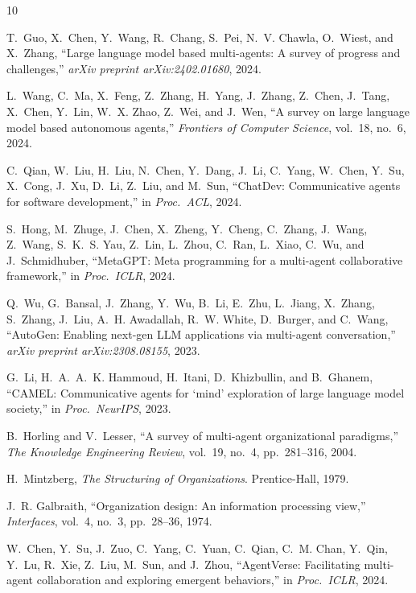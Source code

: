 \documentclass[conference]{IEEEtran}
\begin{document}
\begin{thebibliography}{10}

T.~Guo, X.~Chen, Y.~Wang, R.~Chang, S.~Pei, N.~V. Chawla, O.~Wiest, and X.~Zhang,
``Large language model based multi-agents: A survey of progress and challenges,''
\emph{arXiv preprint arXiv:2402.01680}, 2024.

L.~Wang, C.~Ma, X.~Feng, Z.~Zhang, H.~Yang, J.~Zhang, Z.~Chen, J.~Tang, X.~Chen, Y.~Lin, W.~X. Zhao, Z.~Wei, and J.~Wen,
``A survey on large language model based autonomous agents,''
\emph{Frontiers of Computer Science}, vol.~18, no.~6, 2024.

C.~Qian, W.~Liu, H.~Liu, N.~Chen, Y.~Dang, J.~Li, C.~Yang, W.~Chen, Y.~Su, X.~Cong, J.~Xu, D.~Li, Z.~Liu, and M.~Sun,
``ChatDev: Communicative agents for software development,''
in \emph{Proc.\ ACL}, 2024.

S.~Hong, M.~Zhuge, J.~Chen, X.~Zheng, Y.~Cheng, C.~Zhang, J.~Wang, Z.~Wang, S.~K.~S. Yau, Z.~Lin, L.~Zhou, C.~Ran, L.~Xiao, C.~Wu, and J.~Schmidhuber,
``MetaGPT: Meta programming for a multi-agent collaborative framework,''
in \emph{Proc.\ ICLR}, 2024.

Q.~Wu, G.~Bansal, J.~Zhang, Y.~Wu, B.~Li, E.~Zhu, L.~Jiang, X.~Zhang, S.~Zhang, J.~Liu, A.~H. Awadallah, R.~W. White, D.~Burger, and C.~Wang,
``AutoGen: Enabling next-gen LLM applications via multi-agent conversation,''
\emph{arXiv preprint arXiv:2308.08155}, 2023.

G.~Li, H.~A.~A.~K. Hammoud, H.~Itani, D.~Khizbullin, and B.~Ghanem,
``CAMEL: Communicative agents for `mind' exploration of large language model society,''
in \emph{Proc.\ NeurIPS}, 2023.

B.~Horling and V.~Lesser,
``A survey of multi-agent organizational paradigms,''
\emph{The Knowledge Engineering Review}, vol.~19, no.~4, pp.~281--316, 2004.

H.~Mintzberg,
\emph{The Structuring of Organizations}.
Prentice-Hall, 1979.

J.~R. Galbraith,
``Organization design: An information processing view,''
\emph{Interfaces}, vol.~4, no.~3, pp.~28--36, 1974.

W.~Chen, Y.~Su, J.~Zuo, C.~Yang, C.~Yuan, C.~Qian, C.~M. Chan, Y.~Qin, Y.~Lu, R.~Xie, Z.~Liu, M.~Sun, and J.~Zhou,
``AgentVerse: Facilitating multi-agent collaboration and exploring emergent behaviors,''
in \emph{Proc.\ ICLR}, 2024.


\end{thebibliography}
\end{document}
